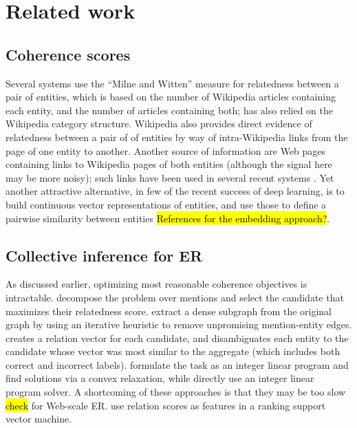 
\section{Related work}
\label{sec:related}

\subsection{Coherence scores}

Several systems \cite{Milne2008,KulkarniSRC09,Hoffart2011} use the ``Milne and Witten'' measure for relatedness between a pair of entities, which is based on the number of Wikipedia articles containing each entity, and the number of articles containing both; \cite{Cucerzan07} has also relied on the Wikipedia category structure. %
Wikipedia also provides direct evidence of relatedness between a pair of of entities by way of intra-Wikipedia links from the page of one entity to another. Another source of information are Web pages containing links to Wikipedia pages of both entities (although the signal here may be more noisy); such links have been used in several recent systems \cite{ChengR13,Chisholm2015}.  Yet another attractive alternative, in few of the recent success of deep learning, is to build continuous vector representations of entities, and use those to define a pairwise similarity between entities \hl{References for the embedding approach?}.


\subsection{Collective inference for ER}

As discussed earlier, optimizing most reasonable coherence objectives is intractable. \cite{Milne2008,Ferragina10} decompose the problem over mentions and select the candidate that maximizes their relatedness score.  
 \cite{Hoffart2011} extract a dense subgraph from the original graph by using an iterative heuristic to remove unpromising mention-entity edges. \cite{Cucerzan07} creates a relation vector for each candidate, and disambiguates each entity to the candidate whose vector was most similar to the aggregate (which includes both correct and incorrect labels).  formulate the task as an integer linear program and find solutions via a convex relaxation, while  directly use an integer linear program solver. A shortcoming of these approaches is that they may be too slow \hl{check} for Web-scale ER.  use relation scores as features in a ranking support vector machine.
 
